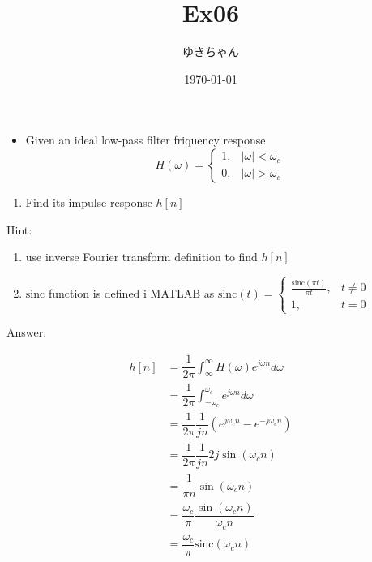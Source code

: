 \documentclass[a4paper,16pt]{jsarticle}
\title{Ex06}
\author{ゆきちゃん}
\date{\today}
\begin{document}
\maketitle

\begin{itemize}
	\item Given an ideal low-pass filter friquency response
	\begin{equation}
		H(\omega) =
		\begin{cases}
			1, & |\omega| < \omega_c \\
			0, & |\omega| > \omega_c
		\end{cases}
	\end{equation}
\end{itemize}

\begin{enumerate}
	\item Find its impulse response $h[n]$
\end{enumerate}

Hint:
\begin{enumerate}
	\item use inverse Fourier transform definition to find $h[n]$
	\item $\mathrm{sinc}$ function is defined i MATLAB as $
	\mathrm{sinc}(t) =
	\begin{cases}
	 \frac{\mathrm{sinc}(\pi t)}{\pi t}, & t \neq 0 \\
		1, & t = 0
	\end{cases}
	$
\end{enumerate}

Answer:

\begin{align}
	h[n] &= \dfrac{1}{2\pi}\int_{\infty}^\infty H(\omega)e^{j\omega n} d\omega \\
	&= \dfrac{1}{2\pi}\int_{-\omega_c}^{\omega_c}e^{j\omega n} d\omega \\
	&= \dfrac{1}{2\pi}\dfrac{1}{jn}(e^{j\omega_c n} - e^{-j\omega_c n}) \\
	&= \dfrac{1}{2\pi}\dfrac{1}{jn} 2j\sin(\omega_c n) \\
	&= \dfrac{1}{\pi n}\sin(\omega_c n) \\
	&= \dfrac{\omega_c}{\pi} \dfrac{\sin(\omega_c n)}{\omega_c n} \\
	&= \dfrac{\omega_c}{\pi} \mathrm{sinc}(\omega_c n)
\end{align}
\end{document}
